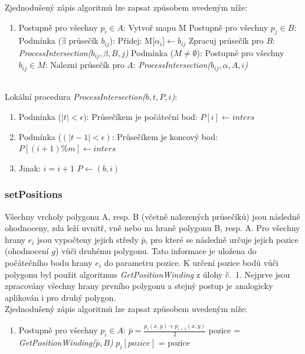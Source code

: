 \documentclass[a4paper, 12pt]{article}
\begin{document}
Zjednodušený zápis algoritmů lze zapsat způsobem uvedeným níže:

\begin{enumerate}
\item[] Postupně pro všechny $p_i \in A$:
\subitem Vytvoř mapu M 
\subitem Postupně pro všechny $p_j \in B$:
\subitem \hspace {0.5cm} Podmínka ($\exists$ průsečík $b_{ij}$):
\subitem \hspace {1cm} Přidej: M[$\alpha_{i}] \leftarrow b_{ij}$
\subitem \hspace {1cm} Zpracuj průsečík pro $B$: \textit{ProcessIntersection($b_{ij}, \beta, B, j$)}
\subitem Podmínka ($M \neq \emptyset$):
\subitem \hspace {0.5cm} Postupně pro všechny $b_{ij} \in M$:
\subitem \hspace {1cm} Nalezni průsečík pro $A$: \textit{ProcessIntersection($b_{ij}, \alpha, A, i$)}
\end{enumerate}
~\\

Lokální procedura \textit{ProcessIntersection($b, t, P, i$)}:
\begin{enumerate}
\item  Podmínka ($|t| < \epsilon)$: 
\subitem Průsečíkem je počáteční bod: $P[i] \leftarrow inters$
\item  Podmínka ($(|t-1| < \epsilon)$:
\subitem Průsečíkem je koncový bod: $P[(i+1)\%m] \leftarrow inters$
\item  Jinak:
\subitem $i = i+1$
\subitem $P \leftarrow (b,i)$
\end{enumerate}

\subsubsection{setPositions}
Všechny vrcholy polygonu A, resp. B (včetně nalezených průsečíků) jsou následně ohodnoceny, zda leží uvnitř, vně nebo na hraně polygonu B, resp. A. Pro všechny hrany $e_i$ jsou vypočteny jejich středy $\bar{p}$, pro které se následně určuje jejich pozice (ohodnocení $g$) vůči druhému polygonu. Tato informace je uložena do počátečního bodu hrany $e_i$ do parametru pozice. K určení pozice bodů vůči polygonu byl použit algoritmus \textit{GetPositionWinding} z úlohy č.~1. Nejprve jsou zpracovány všechny hrany prvního polygonu a stejný postup je analogicky aplikován i pro druhý polygon. \\

Zjednodušený zápis algoritmů lze zapsat způsobem uvedeným níže:
\begin{enumerate}
\item [] Postupně pro všechny $p_i \in A$:
\subitem $\bar{p} = \frac{p_i(x,y)+p_{i+1}(x,y)}{2}$
\subitem pozice = \textit{GetPositionWinding($\bar{p},B$)}
\subitem $p_i[pozice]$ = pozice
\end{enumerate}
\end{document}
